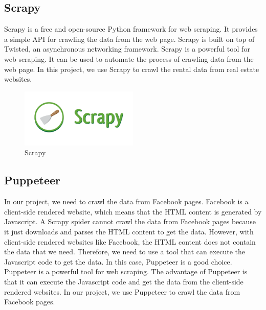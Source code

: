 \subsection{Scrapy}
Scrapy is a free and open-source Python framework for web scraping. It provides a simple API for crawling the data from the web page. Scrapy is built on top of Twisted, an asynchronous networking framework. Scrapy is a powerful tool for web scraping. It can be used to automate the process of crawling data from the web page. In this project, we use Scrapy to crawl the rental data from real estate websites.
\begin{figure}[ht]
    \centering
    \includegraphics[width=0.5\textwidth]{Images/8.Technology_Stack/scrapy.png}
    \caption{Scrapy}
    \label{fig:scrapy}
\end{figure}

\subsection{Puppeteer}
In our project, we need to crawl the data from Facebook pages. Facebook is a client-side rendered website, which means that the HTML content is generated by Javascript. A Scrapy spider cannot crawl the data from Facebook pages because it just downloads and parses the HTML content to get the data. However, with client-side rendered websites like Facebook, the HTML content does not contain the data that we need. Therefore, we need to use a tool that can execute the Javascript code to get the data. In this case, Puppeteer is a good choice. Puppeteer is a powerful tool for web scraping. The advantage of Puppeteer is that it can execute the Javascript code and get the data from the client-side rendered websites. In our project, we use Puppeteer to crawl the data from Facebook pages.

